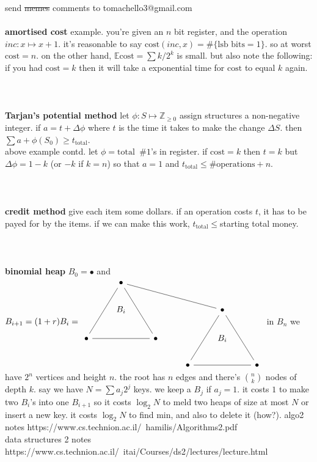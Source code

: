 \documentclass{article}
\newcommand{\n}{\\ \\}
\renewcommand{\sp}{\phantom{a}}
\newcommand{\E}{\mathbb{E}}
\newcommand{\cost}{\text{cost}}
\newcommand{\Z}{\mathbb{Z}}
\newcommand{\total}{\text{total}}
\renewcommand{\lg}{\log_2}
\newcommand{\blue}[1]{{\color{blue}{#1}}}
\begin{document}
send \sout{memes} comments to tomachello3@gmail.com\n
\textbf{amortised cost}
example. you're given an $n$ bit register, and the operation $inc:x\mapsto x+1$. it's reasonable to say $\cost(inc,x)=\#\{\text{lsb bits} =1\}$. so at worst $\cost=n$. on the other hand, $\E\cost=\sum k/2^k$ is small. but also note the following: if you had $\cost = k$ then it will take a exponential time for $\cost$ to equal $k$ again. \blue{one costly operation for a bunch of cheap ones.}
\n\n
\textbf{Tarjan's potential method}
let  $\phi:S\mapsto\Z_{\ge0}$ assign structures a non-negative integer. if $a=t+\Delta\phi$ where $t$ is the time it takes to make the change $\Delta S$. then $\sum a + \phi(S_0)\ge t_{\total}$.\\
above example contd. let $\phi=\total\sp \#1$'s in register. if $\cost=k$ then $t=k$ but $\Delta\phi=1-k$ (or $-k$ if $k=n$) so that $a=1$ and $t_\total\le\#\text{operations}+n$.
\n\n
\textbf{credit method}
give each item some dollars. if an operation costs $t$, it has to be payed for by the items. if we can make this work, $t_\total\le$starting total money.
\n\n
\textbf{binomial heap}
$B_0=\bullet$ and $B_{i+1}=(1+r)B_i=\begin{tikzcd}
	& \bullet \\
	& {B_i} &&& \bullet \\
	\bullet && \bullet && {B_i} \\
	&&& \bullet && \bullet
	\arrow[no head, from=1-2, to=3-1]
	\arrow[no head, from=1-2, to=3-3]
	\arrow[no head, from=3-1, to=3-3]
	\arrow[no head, from=1-2, to=2-5]
	\arrow[no head, from=2-5, to=4-6]
	\arrow[no head, from=2-5, to=4-4]
	\arrow[no head, from=4-6, to=4-4]
\end{tikzcd}$ in $B_n$ we have $2^n$ vertices and height $n$. the root has $n$ edges and there's ${n\choose k}$ nodes of depth $k$. say we have $N=\sum a_j2^j$ keys. we keep a $B_j$ if $a_j=1$. it costs $1$ to make two $B_i$'s into one $B_{i+1}$ so it costs $\lg N$ to meld two heaps of size at most $N$ or insert a new key. it costs $\lg N$ to find min, and also to delete it (how?).
\clearpage
algo2 notes https://www.cs.technion.ac.il/~hamilis/Algorithms2.pdf\\
data structures 2 notes https://www.cs.technion.ac.il/~itai/Courses/ds2/lectures/lecture.html\\
\end{document}
